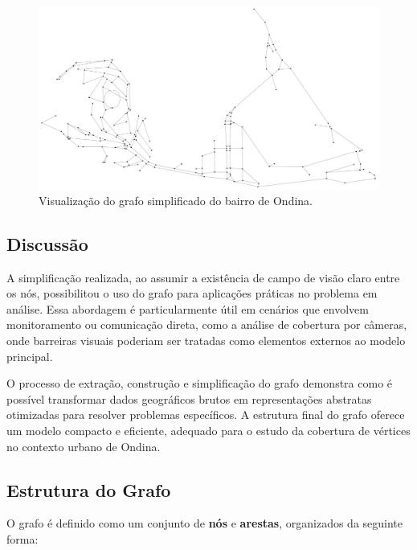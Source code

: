 \documentclass[12pt, a4paper]{report}
\begin{document}
\begin{figure}[H]
    \centering
    \includegraphics[width=\textwidth]{ondina_grafo_simplificado}
    \caption{Visualização do grafo simplificado do bairro de Ondina.}
    \label{fig:ondina_grafo_simplificado}
\end{figure}

\subsection{Discussão}

A simplificação realizada, ao assumir a existência de campo de visão claro entre os nós, possibilitou o uso do grafo para aplicações práticas no problema em análise. Essa abordagem é particularmente útil em cenários que envolvem monitoramento ou comunicação direta, como a análise de cobertura por câmeras, onde barreiras visuais poderiam ser tratadas como elementos externos ao modelo principal.

O processo de extração, construção e simplificação do grafo demonstra como é possível transformar dados geográficos brutos em representações abstratas otimizadas para resolver problemas específicos. A estrutura final do grafo oferece um modelo compacto e eficiente, adequado para o estudo da cobertura de vértices no contexto urbano de Ondina.

\subsection{Estrutura do Grafo}

O grafo é definido como um conjunto de \textbf{nós} e \textbf{arestas}, organizados da seguinte forma:
\end{document}
